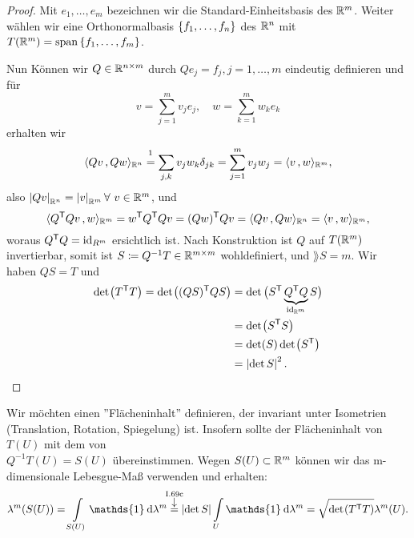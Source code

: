 \documentclass[skript.tex]{subfiles}
\begin{document}

\begin{proof}
	Mit $e_1, \dots, e_m$ bezeichnen wir die Standard-Einheitsbasis des $\mathbb{R}^m$. Weiter wählen wir eine Orthonormalbasis $\left\{f_1, \dots, f_n\right\}$ des ${\mathbb{R}^n}$ mit $T(\mathbb{R}^m) = \operatorname{span} \left\{f_1, \dots, f_m\right\}$.
	
	Nun Können wir $Q \in \mathbb{R}^{n\times m}$ durch $Qe_j = f_j, j=1,\dots,m$ eindeutig definieren und für 
	\[
		v = \sum_{j=1}^{m} v_j e_j,\quad w = \sum_{k =1}^m w_k e_k
	\]
	erhalten wir
	\[
		\skp{Qv}{Qw}_{\Rn} \stackrel{\footnotemark}{=} \sum_{j,k} v_j w_k \delta_{jk} = \sum_{j=1}^m v_j w_j = \skp{v}{w}_{\R^m},
	\]
	also $\left| Qv \right|_{{\mathbb{R}^n}} = \left| v \right|_{\mathbb{R}^m} \forall\ v\in \mathbb{R}^m$, und
	\[
		\langle Q^{\mathsf{T}} Qv\,{,}\,w \rangle_{\mathbb{R}^m} = w^{\mathsf{T}} Q^{\mathsf{T}} Qv = (Qw)^{\mathsf{T}} Qv = \langle Qv\,{,}\,Qw \rangle_{{\mathbb{R}^n}} = \langle v\,{,}\,w \rangle_{\mathbb{R}^m},
	\]
	woraus $Q^{\mathsf{T}} Q = \mathrm{id}_{R^m}$ ersichtlich ist. Nach Konstruktion ist $Q$ auf $T(\mathbb{R}^m)$ invertierbar, somit ist $S \coloneqq Q^{-1} T \in \mathbb{R}^{m\times m}$ wohldefiniert, und $\rang S = m$. Wir haben $QS = T$ und 
	\begin{align*}
		\det\pr{T^\tp T} = \det\pr{(QS)^\tp QS} &= \det\big( S^\tp \underbrace{Q^\tp Q}_{\mathclap{\id_{\R^m} }} S\big)\\
		&= \det\pr{S^\tp S}\\ 
		&= \det(S) \det\pr{S^\tp}\\
		&= \abs{\det S}^2.
	\end{align*}
\end{proof}

Wir möchten einen ''Flächeninhalt'' definieren, der invariant unter Isometrien (Translation, Rotation, Spiegelung) ist. Insofern sollte der Flächeninhalt von $T(U)$ mit dem von \\$Q^{-1} T(U) = S(U)$ übereinstimmen. Wegen $S(U) \subset \mathbb{R}^m$ können wir das m-dimensionale Lebesgue-Maß verwenden und erhalten:
\[
	\lambda^m (S(U)) = \lint_{S(U)} \mathds{1} \md \lambda^m \darrow{\textup{I.69c}}{=} \abs{\det S} \lint_U \mathds{1} \md \lambda^m = \sqrt{\det \pr{T^\tp T}} \lambda^m(U).
\]
\end{document}
